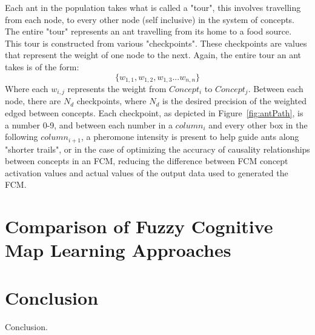 \documentclass{umm-senior-sem}
\begin{document}
Each ant in the population takes what is called a "tour", this involves travelling from each node, to every other node (self inclusive) in the system of concepts. The entire "tour" represents an ant travelling from its home to a food source. This tour is constructed from various "checkpoints". These checkpoints are values that represent the weight of one node to the next. Again, the entire tour an ant takes is of the form: 
\begin{equation}
 \big\{w_{1,1}, w_{1,2}, w_{1,3} ... w_{n,n}\big\} 
\end{equation}
Where each $w_{i,j}$ represents the weight from $Concept_i$ to $Concept_j$.
Between each node, there are $N_d$ checkpoints, where $N_d$ is the desired precision of the weighted edged between concepts. Each checkpoint, as depicted in Figure~\ref{fig:antPath}, is a number 0-9, and between each number in a $column_i$ and every other box in the following $column_{i+1}$, a pheromone intensity is present to help guide ants along "shorter trails", or in the case of optimizing the accuracy of causality relationships between concepts in an FCM, reducing the difference between FCM concept activation values and actual values of the output data used to generated the FCM.

\section{Comparison of Fuzzy Cognitive Map Learning Approaches}
\label{sec:comparison}

\section{Conclusion}
\label{sec:Conclusion}
Conclusion.

\nocite{*}



\end{document}

